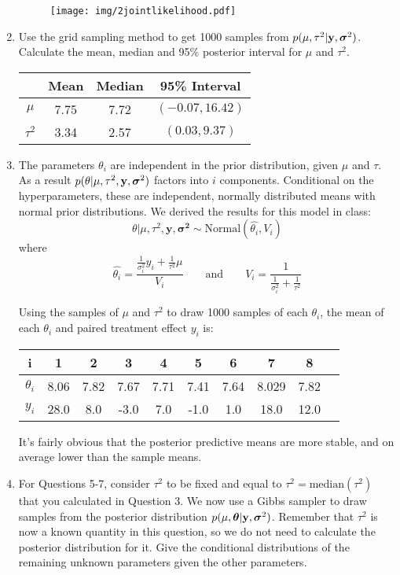 \documentclass[12pt]{article}
\def\y{\mathbf{y}}
\newcommand{\si}{\mbox{\boldmath $\sigma$}}
\newcommand{\bth}{\mbox{\boldmath $\theta$}}
\begin{document}
\begin{enumerate}
	\begin{figure}[h]
		\centering
			\texttt{[image: img/2jointlikelihood.pdf]}
	\end{figure}
	
	
	\item Use the grid sampling method to get 1000 samples from $p(\mu,\tau^2|\y,\si^2)$. Calculate the mean, median and 95\% posterior interval for $\mu$ and $\tau^2$.
	\begin{center}
		\begin{tabular}{c|ccc}
		         & Mean & Median &  95\% Interval  \\
		\hline
		$\mu$    & 7.75 & 7.72 & $(-0.07, 16.42)$\\
		$\tau^2$ & 3.34 & 2.57 & $(0.03, 9.37)$\\
		\end{tabular}	
	\end{center}
	
	\item The parameters $\theta_i$ are independent in the prior distribution, given $\mu$ and $\tau$. As a result $p(\mathbf{\theta}|\mu,\tau^2,\y,\si^2)$ factors into $i$ components. Conditional on the hyperparameters, these are independent, normally distributed means with normal prior distributions.  We derived the results for this model in class: \[
		\theta \vert \mu, \tau^2, \mathbf{y}, \mathbf{\sigma^2} \sim \mbox{Normal}(\hat{\theta_i}, V_i)
	\]
	where\[
		\hat{\theta_i} = \dfrac{\frac{1}{\sigma^2_i}y_i + \frac{1}{\tau^2}\mu}{V_i} \qquad \mathrm{ and } \qquad V_i=\dfrac{1}{\frac{1}{\sigma^2_i} + \frac{1}{\tau^2}}
	\]
	
	 Using the samples of $\mu$ and $\tau^2$ to draw 1000 samples of each $\theta_i$, the mean of each $\theta_i$ and paired treatment effect $y_i$ is:
\begin{center}
	\begin{tabular}{c|ccccccccc}
		i & 1 & 2 & 3 & 4 & 5 & 6 & 7 & 8 \\
		\hline
		$\theta_i$ & 8.06 & 7.82 & 7.67 & 7.71 &  7.41 & 7.64 &  8.029 & 7.82 \\
		$y_i$ &  28.0 &   8.0 &  -3.0 &   7.0 &  -1.0 &   1.0 &  18.0 &  12.0 \\
	\end{tabular}
\end{center}
It's fairly obvious that the posterior predictive means are more stable, and on average lower than the sample means.

	
	\item For Questions 5-7, consider $\tau^2$ to be fixed and equal to $\tau^2 = \mbox{median}(\tau^2)$ that you calculated in Question 3. We now use a Gibbs sampler to draw samples from the posterior distribution $p(\mu,\bth|\y,\si^2)$. Remember that $\tau^2$ is now a known quantity in this question, so we do not need to calculate the posterior distribution for it. Give the conditional distributions of the remaining unknown parameters given the other parameters.
	

\end{enumerate}
\end{document}
